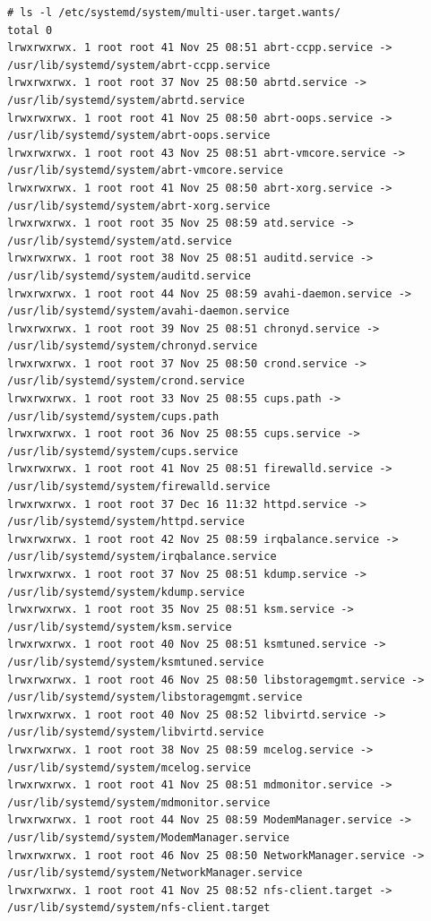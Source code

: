 \vspace{-15pt}
\begin{verbatim}
# ls -l /etc/systemd/system/multi-user.target.wants/
total 0
lrwxrwxrwx. 1 root root 41 Nov 25 08:51 abrt-ccpp.service -> /usr/lib/systemd/system/abrt-ccpp.service
lrwxrwxrwx. 1 root root 37 Nov 25 08:50 abrtd.service -> /usr/lib/systemd/system/abrtd.service
lrwxrwxrwx. 1 root root 41 Nov 25 08:50 abrt-oops.service -> /usr/lib/systemd/system/abrt-oops.service
lrwxrwxrwx. 1 root root 43 Nov 25 08:51 abrt-vmcore.service -> /usr/lib/systemd/system/abrt-vmcore.service
lrwxrwxrwx. 1 root root 41 Nov 25 08:50 abrt-xorg.service -> /usr/lib/systemd/system/abrt-xorg.service
lrwxrwxrwx. 1 root root 35 Nov 25 08:59 atd.service -> /usr/lib/systemd/system/atd.service
lrwxrwxrwx. 1 root root 38 Nov 25 08:51 auditd.service -> /usr/lib/systemd/system/auditd.service
lrwxrwxrwx. 1 root root 44 Nov 25 08:59 avahi-daemon.service -> /usr/lib/systemd/system/avahi-daemon.service
lrwxrwxrwx. 1 root root 39 Nov 25 08:51 chronyd.service -> /usr/lib/systemd/system/chronyd.service
lrwxrwxrwx. 1 root root 37 Nov 25 08:50 crond.service -> /usr/lib/systemd/system/crond.service
lrwxrwxrwx. 1 root root 33 Nov 25 08:55 cups.path -> /usr/lib/systemd/system/cups.path
lrwxrwxrwx. 1 root root 36 Nov 25 08:55 cups.service -> /usr/lib/systemd/system/cups.service
lrwxrwxrwx. 1 root root 41 Nov 25 08:51 firewalld.service -> /usr/lib/systemd/system/firewalld.service
lrwxrwxrwx. 1 root root 37 Dec 16 11:32 httpd.service -> /usr/lib/systemd/system/httpd.service
lrwxrwxrwx. 1 root root 42 Nov 25 08:59 irqbalance.service -> /usr/lib/systemd/system/irqbalance.service
lrwxrwxrwx. 1 root root 37 Nov 25 08:51 kdump.service -> /usr/lib/systemd/system/kdump.service
lrwxrwxrwx. 1 root root 35 Nov 25 08:51 ksm.service -> /usr/lib/systemd/system/ksm.service
lrwxrwxrwx. 1 root root 40 Nov 25 08:51 ksmtuned.service -> /usr/lib/systemd/system/ksmtuned.service
lrwxrwxrwx. 1 root root 46 Nov 25 08:50 libstoragemgmt.service -> /usr/lib/systemd/system/libstoragemgmt.service
lrwxrwxrwx. 1 root root 40 Nov 25 08:52 libvirtd.service -> /usr/lib/systemd/system/libvirtd.service
lrwxrwxrwx. 1 root root 38 Nov 25 08:59 mcelog.service -> /usr/lib/systemd/system/mcelog.service
lrwxrwxrwx. 1 root root 41 Nov 25 08:51 mdmonitor.service -> /usr/lib/systemd/system/mdmonitor.service
lrwxrwxrwx. 1 root root 44 Nov 25 08:59 ModemManager.service -> /usr/lib/systemd/system/ModemManager.service
lrwxrwxrwx. 1 root root 46 Nov 25 08:50 NetworkManager.service -> /usr/lib/systemd/system/NetworkManager.service
lrwxrwxrwx. 1 root root 41 Nov 25 08:52 nfs-client.target -> /usr/lib/systemd/system/nfs-client.target

\end{verbatim}
